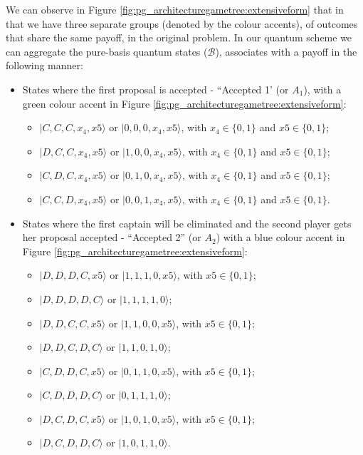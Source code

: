 We can observe in Figure \ref{fig:pg_architecturegametree:extensiveform} that in that we have three separate groups (denoted by the colour accents), of outcomes that share the same payoff, in the original problem. 
In our quantum scheme we can aggregate the pure-basis quantum states ($\mathcal{B}$), associates with a payoff in the following manner: 
\begin{itemize}
\item States where the first proposal is accepted - ``Accepted 1' (or $A_{1}$), with a green colour accent in Figure \ref{fig:pg_architecturegametree:extensiveform}:
\begin{itemize}
\item $\vert C,C,C,x_{4},x{5}\rangle$ or $\vert0,0,0,x_{4},x{5}\rangle$, with $x_{4} \in\{0,1\}$ and $x{5} \in \{0,1\}$;
\item $\vert D,C,C,x_{4},x{5}\rangle$ or $\vert1,0,0,x_{4},x{5}\rangle$, with $x_{4} \in\{0,1\}$ and $x{5} \in \{0,1\}$;
\item $\vert C,D,C,x_{4},x{5}\rangle$ or $\vert0,1,0,x_{4},x{5}\rangle$, with $x_{4} \in\{0,1\}$ and $x{5} \in \{0,1\}$;
\item $\vert C,C,D,x_{4},x{5}\rangle$ or $\vert0,0,1,x_{4},x{5}\rangle$, with $x_{4} \in\{0,1\}$ and $x{5} \in \{0,1\}$.
\end{itemize}
\item States where the first captain will be eliminated and the second player gets her proposal accepted  - ``Accepted 2'' (or $A_{2}$) with a blue colour accent in Figure \ref{fig:pg_architecturegametree:extensiveform}:
\begin{itemize}
\item $\vert D,D,D,C,x{5}\rangle$ or $\vert1,1,1,0,x{5}\rangle$, with $x{5} \in \{0,1\}$;
\item $\vert D,D,D,D,C\rangle$ or $\vert1,1,1,1,0\rangle$;
\item $\vert D,D,C,C,x{5}\rangle$ or $\vert1,1,0,0,x{5}\rangle$, with $x{5} \in \{0,1\}$;
\item $\vert D,D,C,D,C\rangle$ or $\vert1,1,0,1,0\rangle$;
\item $\vert C,D,D,C,x{5}\rangle$ or $\vert0,1,1,0,x{5}\rangle$, with $x{5} \in \{0,1\}$;
\item $\vert C,D,D,D,C\rangle$ or $\vert0,1,1,1,0\rangle$;
\item $\vert D,C,D,C,x{5}\rangle$ or $\vert1,0,1,0,x{5}\rangle$, with $x{5} \in \{0,1\}$;
\item $\vert D,C,D,D,C\rangle$ or $\vert1,0,1,1,0\rangle$.

\end{itemize}
\end{itemize}
